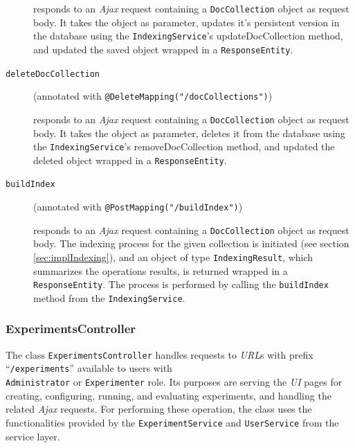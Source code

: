 \documentclass[a4paper]{usiinfbachelorproject}
\begin{document}
\begin{description}
        responds to an \emph{Ajax} request containing a \texttt{DocCollection} object as request body.
        It takes the object as parameter, updates it's persistent version in the database using the \texttt{IndexingService}'s 
        updateDocCollection method,
        and updated the saved object wrapped in a \texttt{ResponseEntity}.

        \item[\texttt{deleteDocCollection}]
        (annotated with \texttt{@DeleteMapping("/docCollections")})

        responds to an \emph{Ajax} request containing a \texttt{DocCollection} object as request body.
        It takes the object as parameter, deletes it from the database using the \texttt{IndexingService}'s 
        removeDocCollection method,
        and updated the deleted object wrapped in a \texttt{ResponseEntity}.

        \item[\texttt{buildIndex}]
        (annotated with \texttt{@PostMapping("/buildIndex")})

        responds to an \emph{Ajax} request containing a \texttt{DocCollection} object as request body.
        The indexing process for the given collection is initiated (see section \ref{sec:implIndexing}),
        and an object of type \texttt{IndexingResult}, which summarizes the operations results,
        is returned wrapped in a \texttt{ResponseEntity}. The process is performed by
        calling the \texttt{buildIndex} method from the \texttt{IndexingService}.


    \end{description}


\subsubsection{\textbf{ExperimentsController}}

The class \texttt{ExperimentsController} handles requests to \emph{URL}s with prefix 
``\texttt{/experiments}'' available to users with \\ \texttt{Administrator}
or \texttt{Experimenter} role. Its purposes are serving the \emph{UI} pages for creating, configuring, running, and evaluating
experiments, and handling the related \emph{Ajax} requests. For performing these operation, the class uses the functionalities
provided by the \texttt{ExperimentService} and \texttt{UserService} from the service layer. 
\end{document}
